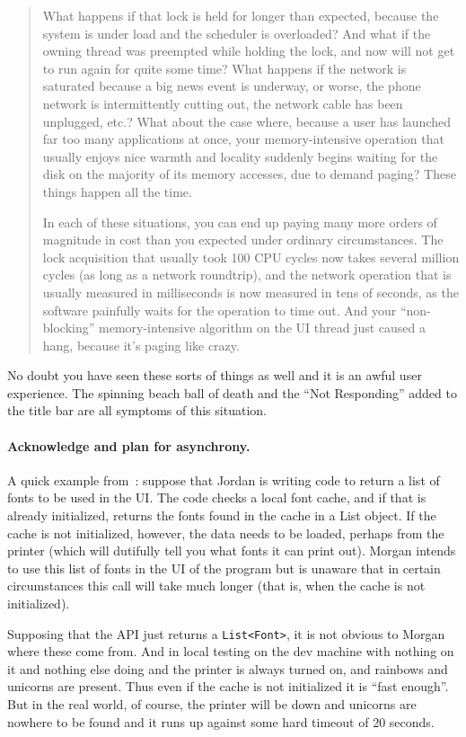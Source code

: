 \begin{quote}
What happens if that lock is held for longer than expected, because the system is under load and the scheduler is overloaded? And what if the owning thread was preempted while holding the lock, and now will not get to run again for quite some time? What happens if the network is saturated because a big news event is underway, or worse, the phone network is intermittently cutting out, the network cable has been unplugged, etc.? What about the case where, because a user has launched far too many applications at once, your memory-intensive operation that usually enjoys nice warmth and locality suddenly begins waiting for the disk on the majority of its memory accesses, due to demand paging? These things happen all the time.

In each of these situations, you can end up paying many more orders of magnitude in cost than you expected under ordinary circumstances. The lock acquisition that usually took 100 CPU cycles now takes several million cycles (as long as a network roundtrip), and the network operation that is usually measured in milliseconds is now measured in tens of seconds, as the software painfully waits for the operation to time out. And your ``non-blocking'' memory-intensive algorithm on the UI thread just caused a hang, because it's paging like crazy.
\end{quote}

No doubt you have seen these sorts of things as well and it is an awful user experience. The spinning beach ball of death and the ``Not Responding'' added to the title bar are all symptoms of this situation. 

\paragraph{Acknowledge and plan for asynchrony.} A quick example from~\cite{preopt}: suppose that Jordan is writing code to return a list of fonts to be used in the UI. The code checks a local font cache, and if that is already initialized, returns the fonts found in the cache in a List object. If the cache is not initialized, however, the data needs to be loaded, perhaps from the printer (which will dutifully tell you what fonts it can print out). Morgan intends to use this list of fonts in the UI of the program but is unaware that in certain circumstances this call will take much longer (that is, when the cache is not initialized).

Supposing that the API just returns a \texttt{List<Font>}, it is not obvious to Morgan where these come from. And in local testing on the dev machine with nothing on it and nothing else doing and the printer is always turned on, and rainbows and unicorns are present. Thus even if the cache is not initialized it is ``fast enough''. But in the real world, of course, the printer will be down and unicorns are nowhere to be found and it runs up against some hard timeout of 20 seconds. 

